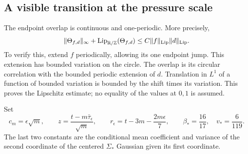 \subsection{A visible transition at the pressure scale}
The endpoint overlap is continuous and one-periodic. More precisely,
\begin{equation}\label{eq:v60-overlap-regularity}
 \|\Theta_{f,d}\|_\infty+
       \operatorname{Lip}_{\R/\Z}(\Theta_{f,d})
                        \le C\|f\|_{\rm Lip}\|d\|_{\rm Lip}.
\end{equation}
To verify this, extend $f$ periodically, allowing its one endpoint
jump. This extension has bounded variation on the circle. The overlap
is its circular correlation with the bounded periodic extension of
$d$. Translation in $L^1$ of a function of bounded variation is bounded
by the shift times its variation. This proves the Lipschitz estimate;
no equality of the values at $0,1$ is assumed.

Set
\begin{equation}\label{eq:v60-critical-variables}
 c_m=\epsilon\sqrt m,\qquad
 z=\frac{t-m\bar\tau_\epsilon}{\sqrt m},\qquad
 r_\epsilon=t-3m-\frac{2m\epsilon}{7},\qquad
 \beta_*=\frac{16}{17},\quad v_*=\frac{6}{119}.
\end{equation}
The last two constants are the conditional mean coefficient and variance
of the second coordinate of the centered $\Sigma_*$ Gaussian given its
first coordinate.

